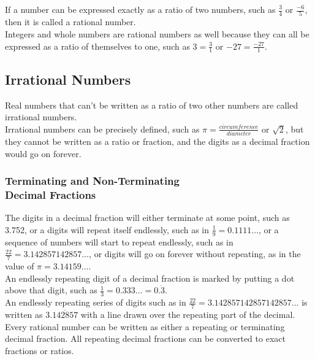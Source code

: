 \documentclass{article}
\begin{document}
If a number can be expressed exactly as a ratio of two numbers, such as $\frac{3}{4}$ or $\frac{-6}{5}$, then it is called a rational number.\\

Integers and whole numbers are rational numbers as well because they can all be expressed as a ratio of themselves to one, such as $3=\frac{3}{1}$ or $-27=\frac{-27}{1}$.\\

\subsection*{Irrational Numbers}

Real numbers that can't be written as a ratio of two other numbers are called irrational numbers.\\

Irrational numbers can be precisely defined, such as $\pi = \frac{circumference}{diameter}$ or $\sqrt{2}$, but they cannot be written as a ratio or fraction, and the digits as a decimal fraction would go on forever.\\

\subsubsection*{Terminating and Non-Terminating\\Decimal Fractions}

The digits in a decimal fraction will either terminate at some point, such as 3.752, or a digits will repeat itself endlessly, such as in $\frac{1}{9}=0.1111\dots$, or a sequence of numbers will start to repeat endlessly, such as in $\frac{22}{7}=3.142857142857\dots$, or digits will go on forever without repeating, as in the value of $\pi = 3.14159\dots$.\\

An endlessly repeating digit of a decimal fraction is marked by putting a dot above that digit, such as $\frac{1}{3}=0.333\ldots=0.\dot{3}.$\\

An endlessly repeating series of digits such as in $\frac{22}{7}=3.142857142857142857\dots$ is written as $3.\overline{142857}$ with a line drawn over the repeating part of the decimal.\\

Every rational number can be written as either a repeating or terminating decimal fraction. All repeating decimal fractions can be converted to exact fractions or ratios.\\
\end{document}
